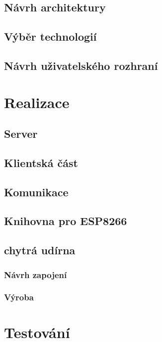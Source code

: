\documentclass[thesis=B,czech]{FITthesis}[2019/12/23]
\begin{document}
\section{Návrh architektury}

\section{Výběr technologií}

\section{Návrh uživatelského rozhraní}




\chapter{Realizace}

\section{Server}

\section{Klientská část}

\section{Komunikace}

\section{Knihovna pro ESP8266}

\section{chytrá udírna}

\subsection{Návrh zapojení}

\subsection{Výroba}



\chapter{Testování}
\end{document}
